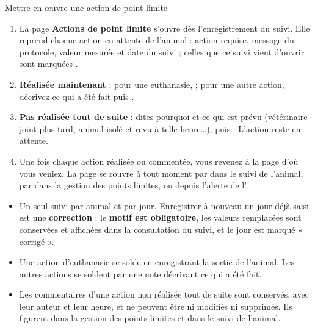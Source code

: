 \documentclass[11pt,a4paper]{article}
\begin{document}
\begin{procedure}{Mettre en œuvre une action de point limite}
\begin{enumerate}
  \item La page \textbf{Actions de point limite} s'ouvre dès l'enregistrement
    du suivi. Elle reprend chaque action en attente de l'animal : action
    requise, message du protocole, valeur mesurée et date du suivi ; celles
    que ce suivi vient d'ouvrir sont marquées .
  \item \textbf{Réalisée maintenant} : pour une euthanasie,
     ; pour une
    autre action, décrivez ce qui a été fait puis .
  \item \textbf{Pas réalisée tout de suite} : dites pourquoi et ce qui est
    prévu (vétérinaire joint plus tard, animal isolé et revu à telle heure…),
    puis . L'action reste en attente.
  \item Une fois chaque action réalisée ou commentée, vous revenez à la page
    d'où vous veniez. La page se rouvre à tout moment par
     dans le suivi de l'animal, par
     dans la gestion des points limites, ou depuis
    l'alerte de l'.
\end{enumerate}
\end{procedure}

\begin{trace}
\begin{itemize}
  \item Un seul suivi par animal et par jour. Enregistrer à nouveau un jour
    déjà saisi est une \textbf{correction} : le \textbf{motif est
    obligatoire}, les valeurs remplacées sont conservées et affichées dans la
    consultation du suivi, et le jour est marqué « corrigé ».
  \item Une action d'euthanasie se solde en enregistrant la sortie de
    l'animal. Les autres actions se soldent par une note décrivant ce qui a
    été fait.
  \item Les commentaires d'une action non réalisée tout de suite sont
    conservés, avec leur auteur et leur heure, et ne peuvent être ni modifiés
    ni supprimés. Ils figurent dans la gestion des points limites et dans le
    suivi de l'animal.
\end{itemize}
\end{trace}
\end{document}
